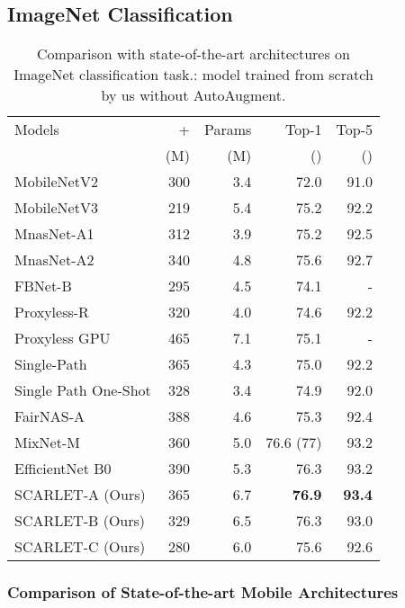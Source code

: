 \documentclass[runningheads]{llncs}
\begin{document}
\subsection{ImageNet Classification} 


\setlength{\tabcolsep}{4pt}
\begin{table}
\centering
\caption{Comparison with state-of-the-art architectures on ImageNet classification task.: model trained from scratch by us without AutoAugment.}
\begin{tabular}{|l|r|r|r|r|}  
\hline
Models  & +  & Params  & Top-1 & Top-5 \\
&(M)&(M)&()&()
\\
\hline
MobileNetV2 \cite{sandler2018mobilenetv2}       & 300  & 3.4 & 72.0 & 91.0     \\
MobileNetV3 \cite{howard2019searching} & 219 & 5.4  &75.2 & 92.2   \\
MnasNet-A1 \cite{tan2018mnasnet} & 312 & 3.9 & 75.2 & 92.5   \\
MnasNet-A2 \cite{tan2018mnasnet}  & 340 & 4.8 & 75.6 & 92.7 \\
FBNet-B \cite{wu2018fbnet} & 295 & 4.5 & 74.1 & -\\ 
Proxyless-R \cite{cai2018proxylessnas}   & 320 & 4.0 & 74.6 & 92.2 \\
Proxyless GPU \cite{cai2018proxylessnas}  & 465 & 7.1  & 75.1 & -\\
Single-Path \cite{stamoulis2019single} & 365 & 4.3 & 75.0 & 92.2 \\ 
Single Path One-Shot \cite{guo2019single}  & 328 & 3.4 &74.9 & 92.0 \\
FairNAS-A \cite{chu2019fairnas}  & 388& 4.6 &  75.3 & 92.4 \\ MixNet-M \cite{tan2020mixconv} & 360 & 5.0 & 76.6 (77) & 93.2 \\
EfficientNet B0 \cite{tan2019efficientnet}  & 390 & 5.3 &  76.3 & 93.2 \\
SCARLET-A (Ours) & 365 & 6.7 &   \textbf{76.9} &\textbf{93.4}  \\
SCARLET-B (Ours) & 329 & 6.5 &76.3 & 93.0  \\
SCARLET-C (Ours) & 280 & 6.0 & 75.6 & 92.6  \\
\hline
\end{tabular}
\label{tab:comparison-imagenet}
\end{table}

\subsubsection{Comparison of State-of-the-art Mobile Architectures}
\end{document}
